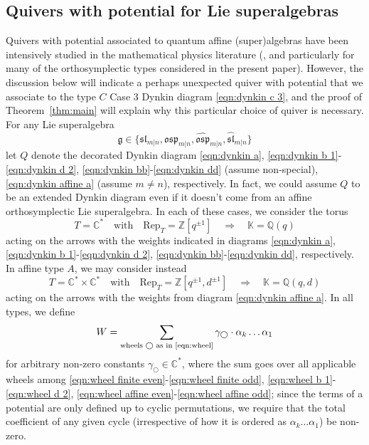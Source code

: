 \documentclass{amsart}
\def\fg{{\mathfrak{g}}}
\def\fsl{{\mathfrak{sl}}}
\def\BC{{\mathbb{C}}}
\def\BK{{\mathbb{K}}}
\def\BQ{{\mathbb{Q}}}
\def\BZ{{\mathbb{Z}}}
\def\fosp{\mathfrak{osp}}
\begin{document}
\medskip 

\subsection{Quivers with potential for Lie superalgebras}
\label{sub:quiver with potential}

Quivers with potential associated to quantum affine (super)algebras have been intensively studied in the mathematical physics literature (\cite{GLY, GY, LY, NW}, and particularly \cite{Bao} for many of the orthosymplectic types considered in the present paper). However, the discussion below will indicate a perhaps unexpected quiver with potential that we associate to the type $C$ Case 3 Dynkin diagram \eqref{eqn:dynkin c 3}, and the proof of Theorem~\ref{thm:main} will explain why this particular choice of quiver is necessary. For any Lie superalgebra
\[
\fg \in \Big\{\fsl_{m|n}, \fosp_{m|n}, \widehat{\fosp}_{m|n}, \widehat{\fsl}_{m|n} \Big\}
\]
let $Q$ denote the decorated Dynkin diagram \eqref{eqn:dynkin a}, \eqref{eqn:dynkin b 1}-\eqref{eqn:dynkin d 2}, \eqref{eqn:dynkin bb}-\eqref{eqn:dynkin dd} (assume non-special), \eqref{eqn:dynkin affine a} (assume $m \neq n$), respectively. In fact, we could assume $Q$ to be an extended Dynkin diagram even if it doesn't come from an affine orthosymplectic Lie superalgebra. In each of these cases, we consider the torus
\[
T = \BC^* \quad \text{with} \quad \text{Rep}_T = \BZ[q^{\pm 1}] \quad \Rightarrow \quad \BK = \BQ(q)
\]
acting on the arrows with the weights indicated in diagrams \eqref{eqn:dynkin a}, \eqref{eqn:dynkin b 1}-\eqref{eqn:dynkin d 2}, \eqref{eqn:dynkin bb}-\eqref{eqn:dynkin dd}, respectively. In affine type $A$, we may consider instead
\[
T = \BC^* \times \BC^* \quad \text{with} \quad \text{Rep}_T = \BZ[q^{\pm 1},d^{\pm 1}] \quad \Rightarrow \quad \BK = \BQ(q,d)
\]
acting on the arrows with the weights from diagram \eqref{eqn:dynkin affine a}. In all types, we define 
\begin{equation}
\label{eqn:super potential}
W = \sum_{\text{wheels }\bigcirc \text{ as in \eqref{eqn:wheel}}} \gamma_{\bigcirc} \cdot \alpha_k \dots \alpha_1
\end{equation}
for arbitrary non-zero constants $\gamma_{\bigcirc} \in \BC^*$, where the sum goes over all applicable wheels among \eqref{eqn:wheel finite even}-\eqref{eqn:wheel finite odd}, \eqref{eqn:wheel b 1}-\eqref{eqn:wheel d 2}, \eqref{eqn:wheel affine even}-\eqref{eqn:wheel affine odd}; since the terms of a potential are only defined up to cyclic permutations, we require that the total coefficient of any given cycle (irrespective of how it is ordered as $\alpha_k \dots \alpha_1$) be non-zero.
\end{document}

